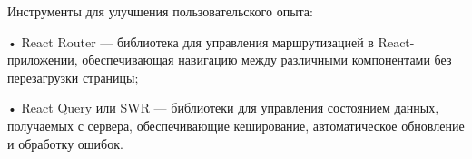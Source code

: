 {  \par \redline Инструменты для улучшения пользовательского опыта:

  \par \redline • React Router — библиотека для управления маршрутизацией в React-приложении, обеспечивающая навигацию между различными компонентами без перезагрузки страницы;
  \par \redline • React Query или SWR — библиотеки для управления состоянием данных, получаемых с сервера, обеспечивающие кеширование, автоматическое обновление и обработку ошибок.
  \par
}